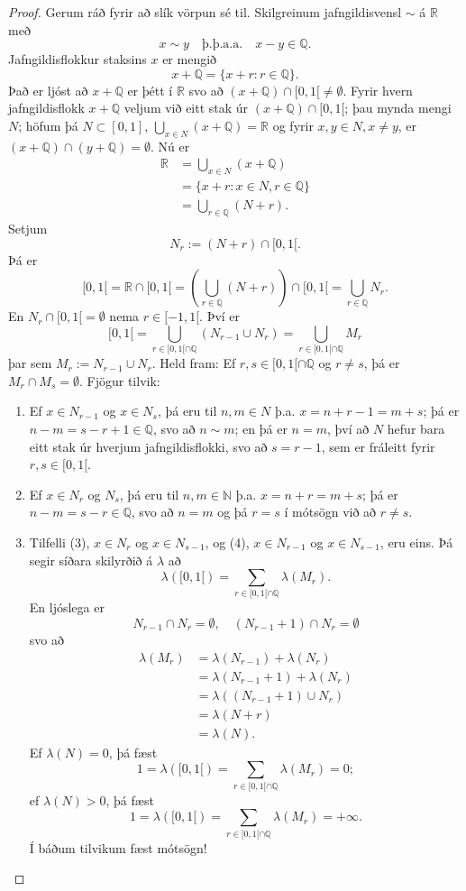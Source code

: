 \documentclass[a4paper,icelandic,11pt]{book}
\theoremstyle{plain}      \newtheorem{setn}{Setning}[chapter]
\theoremstyle{definition} \newtheorem{skilgr}[setn]{Skilgreining}
\theoremstyle{remark}     \newtheorem*{ath}{Athugasemd}
\newcommand{\R}{\mathbb R}
\newcommand{\Q}{\mathbb Q}
\newcommand{\N}{\mathbb N}
\begin{document}
\begin{proof}
  Gerum ráð fyrir að slík vörpun sé til. Skilgreinum jafngildisvensl
  $\sim$ á $\R$ með
  \[
  x\sim y \quad\text{þ.þ.a.a.}\quad x-y\in\Q.
  \]
  Jafngildisflokkur staksins $x$ er
  mengið
  \[
  x+\Q = \{x+r :r\in \Q\}.
  \]
  Það er ljóst að $x+\Q$ er þétt í $\R$ svo að
  $(x+\Q)\cap[0,1[\ne\emptyset$. Fyrir hvern jafngildisflokk $x+\Q$
  veljum við eitt stak úr $(x+\Q)\cap[0,1[$; þau mynda mengi $N$;
  höfum þá $N\subset[0,1]$, $\bigcup_{x\in N}(x+\Q)=\R$ og fyrir
  $x,y\in N, x\ne y$, er $(x+\Q)\cap(y+\Q)=\emptyset$. Nú er
  \begin{align*}
    \R
    &= \bigcup_{x\in N}(x+\Q) \\
    &= \{x+r : x\in N, r\in\Q\} \\
    &= \bigcup_{r\in\Q}(N+r).
  \end{align*}
  Setjum
  \[
  N_{r}:=(N+r)\cap[0,1[.
  \]
  Þá er
  \[
  [0,1[
  = \R\cap[0,1[
  = (\bigcup_{r\in\Q}(N+r))\cap[0,1[
  = \bigcup_{r\in\Q} N_{r}.
  \]
  En $N_{r}\cap[0,1[=\emptyset$ nema $r\in[-1,1[$. Því
  er
  \[
  [0,1[
  =\bigcup_{r\in[0,1[\cap\Q}(N_{r-1}\cup N_{r})
  =\bigcup_{r\in[0,1[\cap\Q}M_{r}
  \]
  þar sem $M_{r}:=N_{r-1}\cup N_{r}$. Held fram: Ef
  $r,s\in[0,1[\cap\Q$ og $r\ne s$, þá er $M_{r}\cap
  M_{s}=\emptyset$. Fjögur tilvik:
  \begin{enumerate}[(1)]
  \item Ef $x\in N_{r-1}$ og $x\in N_{s}$, þá eru til $n,m\in N$
    þ.a. $x=n+r-1=m+s$; þá er $n-m=s-r+1\in\Q$, svo að $n\sim m$; en
    þá er $n=m$, því að $N$ hefur bara eitt stak úr hverjum
    jafngildisflokki, svo að $s=r-1$, sem er fráleitt fyrir
    $r,s\in[0,1[$.
  \item Ef $x\in N_{r}$ og $N_{s}$, þá eru til $n,m\in\N$
    þ.a. $x=n+r=m+s$; þá er $n-m=s-r\in\Q$, svo að $n=m$ og þá $r=s$ í
    mótsögn við að $r\ne s$.
  \item[(3-4)] Tilfelli (3), $x\in N_{r}$ og $x\in N_{s-1}$, og (4),
    $x\in N_{r-1}$ og $x\in N_{s-1}$, eru eins. Þá segir síðara
    skilyrðið á $\lambda$ að
    \[
    \lambda([0,1[)=\sum_{r\in[0,1[\cap\Q}\lambda(M_{r}).
    \]
    En ljóslega er
    \[
    N_{r-1}\cap N_{r}=\emptyset,
    \quad
    (N_{r-1}+1)\cap N_{r}=\emptyset
    \]
    svo að
    \begin{align*}
      \lambda(M_{r})
      &= \lambda(N_{r-1})+\lambda(N_{r})\\
      &= \lambda(N_{r-1}+1)+\lambda(N_{r}) \\
      &= \lambda((N_{r-1}+1)\cup N_{r}) \\
      &= \lambda(N+r) \\
      &= \lambda(N).
    \end{align*}
    Ef $\lambda(N)=0$, þá
    fæst
    \[
    1
    =\lambda([0,1[)
    =\sum_{r\in[0,1[\cap\Q}\lambda(M_{r})
    =0;
    \]
    ef $\lambda(N)>0$, þá fæst
    \[
    1
    =\lambda([0,1[)
    =\sum_{r\in[0,1[\cap\Q}\lambda(M_{r})
    =+\infty.
    \]
    Í báðum tilvikum fæst mótsögn!
  \end{enumerate}
\end{proof}
\end{document}
